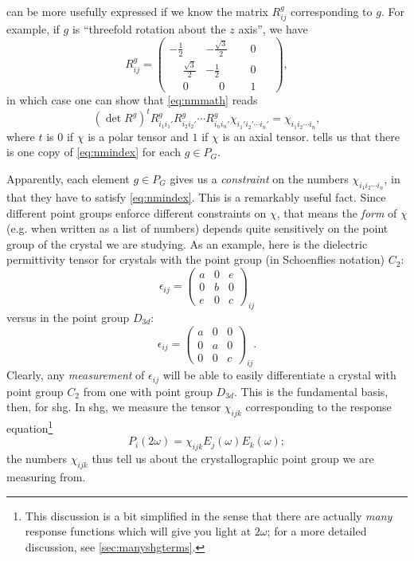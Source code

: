  can be more usefully expressed if we know the matrix $R^g_{ij}$ corresponding to $g$.
For example, if $g$ is ``threefold rotation about the $z$ axis'', we have
\begin{equation}
R^g_{ij} = \left(\begin{matrix}
-\frac{1}{2} & -\frac{\sqrt{3}}{2} & \phantom{-}0\phantom{-} \\
\phantom{-}\frac{\sqrt{3}}{2} & -\frac{1}{2} & \phantom{-}0\phantom{-} \\
\phantom{-}0 & \phantom{-}0 & \phantom{-}1\phantom{-}
\end{matrix}\right),
\end{equation}
in which case one can show that \cref{eq:nmmath} reads
\begin{equation}\label{eq:nmindex}
(\det{R^g})^tR^g_{i_1i_1'}R^g_{i_2i_2'}\cdots R^g_{i_ni_n'}\chi_{i_1'i_2'\cdots i_n'} = \chi_{i_1i_2\cdots i_n},
\end{equation}
where $t$ is $0$ if $\chi$ is a polar tensor and $1$ if $\chi$ is an axial tensor.
 tells us that there is one copy of \cref{eq:nmindex} for each $g \in P_G$. 

Apparently, each element $g \in P_G$ gives us a \emph{constraint} on the numbers $\chi_{i_1i_2\cdots i_n}$, in that they have to satisfy \cref{eq:nmindex}. 
This is a remarkably useful fact.
Since different point groups enforce different constraints on $\chi$, that means the \emph{form} of $\chi$ (e.g. when written as a list of numbers) depends quite sensitively on the point group of the crystal we are studying.
As an example, here is the dielectric permittivity tensor for crystals with the point group (in Schoenflies notation) $C_2$:
\begin{equation}
\epsilon_{ij} = \left(\begin{matrix}
a & 0 & e \\
0 & b & 0 \\
e & 0 & c
\end{matrix}\right)_{ij}
\end{equation}
versus in the point group $D_{3d}$:
\begin{equation}
\epsilon_{ij} = \left(\begin{matrix}
a & 0 & 0 \\
0 & a & 0 \\
0 & 0 & c
\end{matrix}\right)_{ij}.
\end{equation}
Clearly, any \emph{measurement} of $\epsilon_{ij}$ will be able to easily differentiate a crystal with point group $C_2$ from one with point group $D_{3d}$.
This is the fundamental basis, then, for \gls{shg}.
In \gls{shg}, we measure the tensor $\chi_{ijk}$ corresponding to the response equation\footnote{This discussion is a bit simplified in the sense that there are actually \emph{many} response functions which will give you light at $2\omega$; for a more detailed discussion, see \cref{sec:manyshgterms}.}
\begin{equation}\label{eq:shgsimple}
P_i(2\omega) = \chi_{ijk}E_j(\omega)E_k(\omega);
\end{equation}
the numbers $\chi_{ijk}$ thus tell us about the crystallographic point group we are measuring from.

